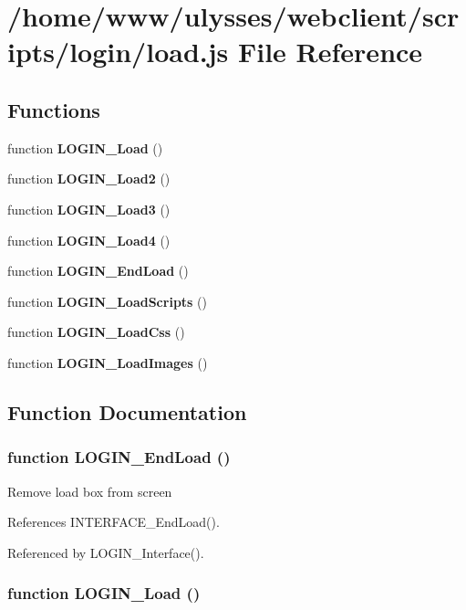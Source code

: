 \section{/home/www/ulysses/webclient/scripts/login/load.js File Reference}
\label{login_2load_8js}
\subsection*{Functions}
\begin{CompactItemize}
\item 
function {\bf LOGIN\_\-Load} ()
\item 
function {\bf LOGIN\_\-Load2} ()
\item 
function {\bf LOGIN\_\-Load3} ()
\item 
function {\bf LOGIN\_\-Load4} ()
\item 
function {\bf LOGIN\_\-EndLoad} ()
\item 
function {\bf LOGIN\_\-LoadScripts} ()
\item 
function {\bf LOGIN\_\-LoadCss} ()
\item 
function {\bf LOGIN\_\-LoadImages} ()
\end{CompactItemize}


\subsection{Function Documentation}
\subsubsection{\setlength{\rightskip}{0pt plus 5cm}function LOGIN\_\-EndLoad ()}\label{login_2load_8js_b75d7f62cdfa88a298172dc1569f273e}


Remove load box from screen 

References INTERFACE\_\-EndLoad().

Referenced by LOGIN\_\-Interface().
\subsubsection{\setlength{\rightskip}{0pt plus 5cm}function LOGIN\_\-Load ()}\label{login_2load_8js_1dd88dc6efb8ed5b7c9e341669ebc8d5}


